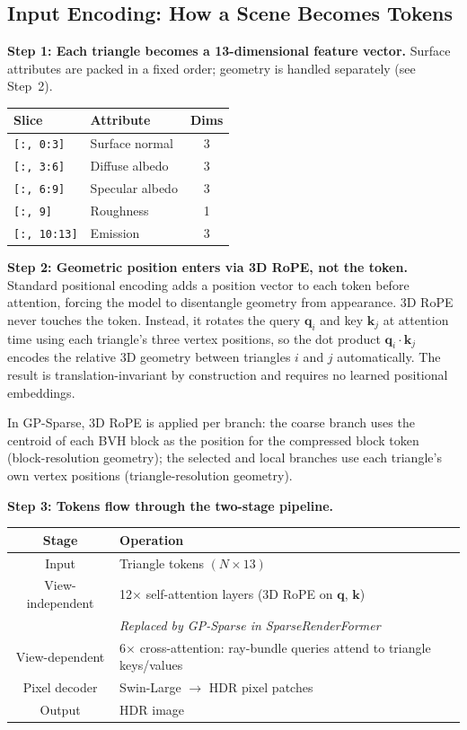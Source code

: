 \documentclass[11pt,letterpaper]{article}
\newcommand{\ours}{SparseRenderFormer}
\newcommand{\code}[1]{\texttt{#1}}
\begin{document}
\subsection*{Input Encoding: How a Scene Becomes Tokens}

\textbf{Step 1: Each triangle becomes a 13-dimensional feature vector.}
Surface attributes are packed in a fixed order; geometry is handled
separately (see Step~2).

\begin{center}\small
\begin{tabular}{@{}llc@{}}
\toprule
Slice & Attribute & Dims \\
\midrule
\code{[:, 0:3]}   & Surface normal    & 3 \\
\code{[:, 3:6]}   & Diffuse albedo    & 3 \\
\code{[:, 6:9]}   & Specular albedo   & 3 \\
\code{[:, 9]}     & Roughness         & 1 \\
\code{[:, 10:13]} & Emission          & 3 \\
\bottomrule
\end{tabular}
\end{center}

\textbf{Step 2: Geometric position enters via 3D RoPE, not the token.}
Standard positional encoding adds a position vector to each token before
attention, forcing the model to disentangle geometry from appearance.
3D RoPE never touches the token.
Instead, it rotates the query $\mathbf{q}_i$ and key $\mathbf{k}_j$ at
attention time using each triangle's three vertex positions, so the dot
product $\mathbf{q}_i \cdot \mathbf{k}_j$ encodes the relative 3D
geometry between triangles $i$ and $j$ automatically.
The result is translation-invariant by construction and requires no
learned positional embeddings.

In GP-Sparse, 3D RoPE is applied per branch:
the coarse branch uses the centroid of each BVH block as the position for
the compressed block token (block-resolution geometry); the selected and
local branches use each triangle's own vertex positions (triangle-resolution
geometry).

\textbf{Step 3: Tokens flow through the two-stage pipeline.}

\begin{center}\small
\begin{tabular}{@{}cl@{}}
\toprule
Stage & Operation \\
\midrule
Input & Triangle tokens $(N \times 13)$ \\
View-independent & 12$\times$ self-attention layers (3D RoPE on $\mathbf{q}$, $\mathbf{k}$) \\
                 & \textit{Replaced by GP-Sparse in \ours} \\
View-dependent   & 6$\times$ cross-attention: ray-bundle queries attend to triangle keys/values \\
Pixel decoder    & Swin-Large $\to$ HDR pixel patches \\
Output           & HDR image \\
\bottomrule
\end{tabular}
\end{center}
\end{document}
